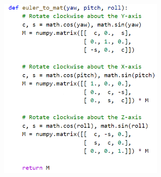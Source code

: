 \documentclass{VUMIFInfBakalaurinis}
\begin{document}
\begin{minipage}{\linewidth}
  \includegraphics[width=8cm]{euler.png}
  \label{euler_img}
\end{minipage}
\end{document}
